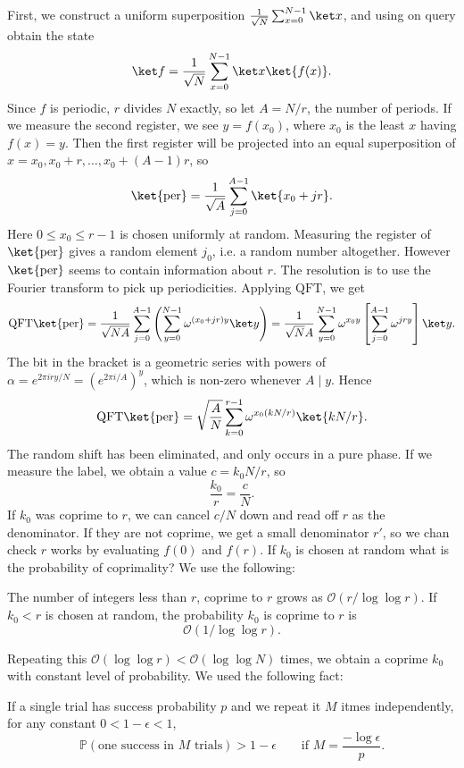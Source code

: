 \documentclass[12pt]{article}
\begin{document}
First, we construct a uniform superposition $\frac{1}{\sqrt N} \sum_{x = 0}^{N-1} \ket x$, and using on query obtain the state
\[
	\ket f = \frac{1}{\sqrt N} \sum_{x = 0}^{N-1} \ket x \ket{f(x)}.
\]
Since $f$ is periodic, $r$ divides $N$ exactly, so let $A = N/r$, the number of periods. If we measure the second register, we see $y = f(x_0)$, where $x_0$ is the least $x$ having $f(x) = y$. Then the first register will be projected into an equal superposition of $x = x_0, x_0 + r, \ldots, x_0 + (A-1)r$, so
\[
	\ket{\mathrm{per}} = \frac{1}{\sqrt A} \sum_{j = 0}^{A-1} \ket{x_0 + jr}.
\]
Here $0 \leq x_0 \leq r-1$ is chosen uniformly at random. Measuring the register of $\ket{\mathrm{per}}$ gives a random element $j_0$, i.e. a random number altogether. However $\ket{\mathrm{per}}$ seems to contain information about $r$. The resolution is to use the Fourier transform to pick up periodicities. Applying $\mathrm{QFT}$, we get
\[
	\mathrm{QFT} \ket{\mathrm{per}} = \frac{1}{\sqrt{NA}} \sum_{j = 0}^{A-1} \left( \sum_{y = 0}^{N-1} \omega^{(x_0 + jr)y} \ket y \right) = \frac{1}{\sqrt NA} \sum_{y = 0}^{N-1} \omega^{x_0 y} \left[ \sum_{j = 0}^{A-1} \omega^{jry} \right] \ket y.
\]
The bit in the bracket is a geometric series with powers of $\alpha = e^{2 \pi i r y/N} = (e^{2 \pi i/ A})^y$, which is non-zero whenever $A \mid y$. Hence
\[
	\mathrm{QFT}\ket{\mathrm{per}} = \sqrt{\frac{A}{N}} \sum_{k = 0}^{r-1} \omega^{x_0(kN/r)} \ket{kN/r}.
\]
The random shift has been eliminated, and only occurs in a pure phase. If we measure the label, we obtain a value $c = k_0 N/r$, so
\[
\frac{k_0}{r} = \frac{c}{N}.
\]
If $k_0$ was coprime to $r$, we can cancel $c/N$ down and read off $r$ as the denominator. If they are not coprime, we get a small denominator $r'$, so we chan check $r$ works by evaluating $f(0)$ and $f(r)$. If $k_0$ is chosen at random what is the probability of coprimality? We use the following:

\begin{theorem}
	The number of integers less than $r$, coprime to $r$ grows as $\mathcal{O}(r/ \log \log r)$. If $k_0 < r$ is chosen at random, the probability $k_0$ is coprime to $r$ is
	\[
	\mathcal{O}(1 / \log \log r).
	\]
\end{theorem}

Repeating this $\mathcal{O}(\log \log r) < \mathcal{O}(\log \log N)$ times, we obtain a coprime $k_0$ with constant level of probability. We used the following fact:
\begin{lemma}
	If a single trial has success probability $p$ and we repeat it $M$ itmes independently, for any constant $0 < 1 - \epsilon < 1$,
	\[
		\mathbb{P}(\text{one success in $M$ trials}) > 1 - \epsilon \qquad \text{if } M = \frac{- \log \epsilon}{p}.
	\]
\end{lemma}
\end{document}
